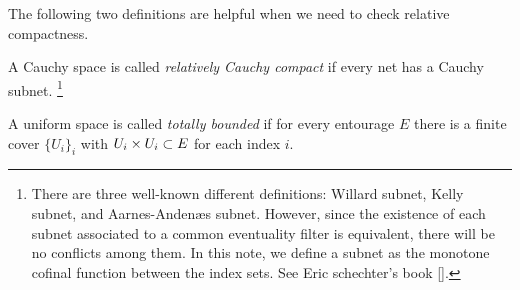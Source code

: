 \documentclass{../exp}
\begin{document}
The following two definitions are helpful when we need to check relative compactness.
\begin{defn}
A Cauchy space is called \emph{relatively Cauchy compact} if every net has a Cauchy subnet.
\footnote{There are three well-known different definitions: Willard subnet, Kelly subnet, and Aarnes-Anden{\ae}s subnet. However, since the existence of each subnet associated to a common eventuality filter is equivalent, there will be no conflicts among them. In this note, we define a subnet as the monotone cofinal function between the index sets. See Eric schechter's book [].}
\end{defn}
\begin{defn}
A uniform space is called \emph{totally bounded} if for every entourage $E$ there is a finite cover $\{U_i\}_i$ with $U_i\times U_i\subset E$ for each index $i$.
\end{defn}
\end{document}
